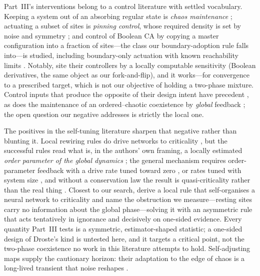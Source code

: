\documentclass[man,12pt,floatsintext,donotrepeattitle]{apa7}
\begin{document}
Part~III's interventions belong to a control literature with settled
vocabulary. Keeping a system out of an absorbing regular state is
\emph{chaos maintenance} \parencite{yang1995preserving,in1995experimental};
actuating a subset of sites is \emph{pinning control}, whose required density
is set by noise and symmetry \parencite{grigoriev1997pinning}; and control of
Boolean CA by copying a master configuration into a fraction of sites---the
class our boundary-adoption rule falls into---is studied, including boundary-only
actuation with known reachability limits
\parencite{bagnoli2012control,bagnoli2018boundary}. Notably,
\textcite{bagnoli2012control} site their controllers by a locally computable
sensitivity (Boolean derivatives, the same object as our fork-and-flip), and
it works---for convergence to a prescribed target, which is not our
objective of holding a two-phase mixture. Control inputs that produce the
opposite of their design intent have precedent
\parencite{hilker2006paradox,wackerbauer2007noise}, as does the maintenance
of an ordered--chaotic coexistence by \emph{global} feedback
\parencite{sieber2014controlling}; the open question our negative addresses
is strictly the local one.

The positives in the self-tuning literature sharpen that negative rather
than blunting it. Local rewiring rules do drive networks to criticality
\parencite{bornholdt2000topological}, but the successful rules read what is,
in the authors' own framing, a locally estimated \emph{order parameter of
the global dynamics} \parencite{bornholdt2003socneural}; the general
mechanism requires order-parameter feedback with a drive rate tuned toward
zero \parencite{sornette1995mapping}, or rates tuned with system size
\parencite{pruessner2006lessons}, and without a conservation law the result
is quasi-criticality rather than the real thing
\parencite{bonachela2009selforganization}. Closest to our search,
\textcite{droste2013analytical} derive a local rule that self-organises a
neural network to criticality and name the obstruction we measure---resting
sites carry no information about the global phase---solving it with an
asymmetric rule that acts tentatively in ignorance and decisively on
one-sided evidence. Every quantity Part~III tests is a symmetric,
estimator-shaped statistic; a one-sided design of Droste's kind is untested
here, and it targets a critical point, not the two-phase coexistence no
work in this literature attempts to hold. Self-adjusting maps supply the
cautionary horizon: their adaptation to the edge of chaos is a long-lived
transient that noise reshapes \parencite{melby2000adaptation,melby2005noise}.
\end{document}
